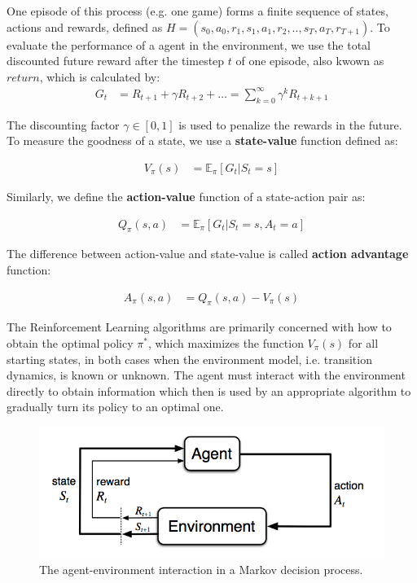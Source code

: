 One episode of this process (e.g. one game) forms a finite sequence of states, actions and rewards, defined as $H = (s_0, a_0, r_1, s_1, a_1, r_2, .., s_T, a_T, r_{T+1})$. To evaluate the performance of a agent in the environment, we use the total discounted future reward after the timestep $t$ of one episode, also kwown as $return$, which is calculated by:
\begin{align}
G_t &= R_{t+1} + \gamma R_{t+2} + \dots = \sum_{k=0}^{\infty} \gamma^k R_{t+k+1}
\end{align}

The discounting factor $\gamma \in [0, 1]$ is used to penalize the rewards in the future. To measure the goodness of a state, we use a \textbf{state-value} function defined as:

\begin{align}
V_{\pi}(s) &= \mathbb{E}_{\pi}[G_t \vert S_t = s]
\end{align}

Similarly, we define the \textbf{action-value} function of a state-action pair as:

\begin{align}
Q_{\pi}(s, a) &= \mathbb{E}_{\pi}[G_t \vert S_t = s, A_t = a]
\end{align}

The difference between action-value and state-value is called \textbf{action advantage} function:

\begin{align}
A_{\pi}(s, a) &= Q_{\pi}(s, a) - V_{\pi}(s)
\end{align}

The Reinforcement Learning algorithms are primarily concerned with how to obtain the optimal policy $\pi^*$, which maximizes the function $V_{\pi}(s)$ for all starting states, in both cases when the environment model, i.e. transition dynamics, is known or unknown. The agent must interact with the environment directly to obtain information which then is used by an appropriate algorithm to gradually turn its policy to an optimal one.

\begin{figure}
\centering
\includegraphics[scale=0.4]{charts/agent_environment_MDP.png}
\caption{The agent-environment interaction in a Markov decision process.}
\end{figure}

